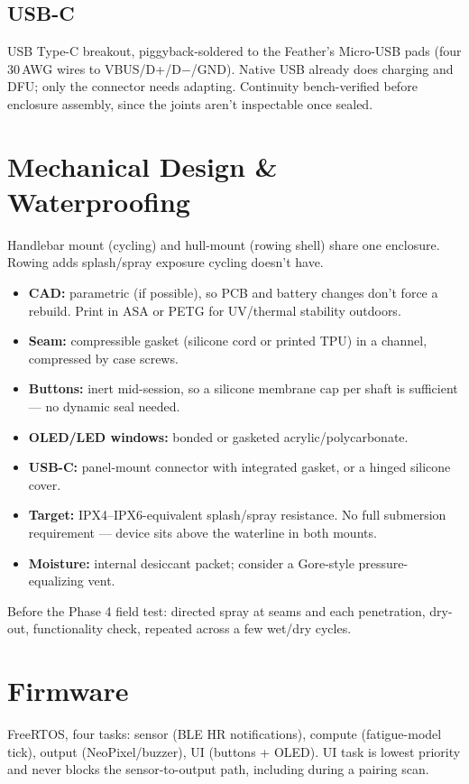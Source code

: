 \documentclass[11pt]{article}
\begin{document}
\subsection{USB-C}
USB Type-C breakout, piggyback-soldered to the Feather's Micro-USB pads (four 30\,AWG wires to VBUS/D+/D$-$/GND). Native USB already does charging and DFU; only the connector needs adapting. Continuity bench-verified before enclosure assembly, since the joints aren't inspectable once sealed.

\section{Mechanical Design \& Waterproofing}
Handlebar mount (cycling) and hull-mount (rowing shell) share one enclosure. Rowing adds splash/spray exposure cycling doesn't have.

\begin{itemize}[topsep=2pt,itemsep=2pt]
    \item \textbf{CAD:} parametric (if possible), so PCB and battery changes don't force a rebuild. Print in ASA or PETG for UV/thermal stability outdoors.
    \item \textbf{Seam:} compressible gasket (silicone cord or printed TPU) in a channel, compressed by case screws.
    \item \textbf{Buttons:} inert mid-session, so a silicone membrane cap per shaft is sufficient --- no dynamic seal needed.
    \item \textbf{OLED/LED windows:} bonded or gasketed acrylic/polycarbonate.
    \item \textbf{USB-C:} panel-mount connector with integrated gasket, or a hinged silicone cover.
    \item \textbf{Target:} IPX4--IPX6-equivalent splash/spray resistance. No full submersion requirement --- device sits above the waterline in both mounts.
    \item \textbf{Moisture:} internal desiccant packet; consider a Gore-style pressure-equalizing vent.
\end{itemize}

Before the Phase 4 field test: directed spray at seams and each penetration, dry-out, functionality check, repeated across a few wet/dry cycles.

\section{Firmware}
FreeRTOS, four tasks: sensor (BLE HR notifications), compute (fatigue-model tick), output (NeoPixel/buzzer), UI (buttons + OLED). UI task is lowest priority and never blocks the sensor-to-output path, including during a pairing scan.
\end{document}
